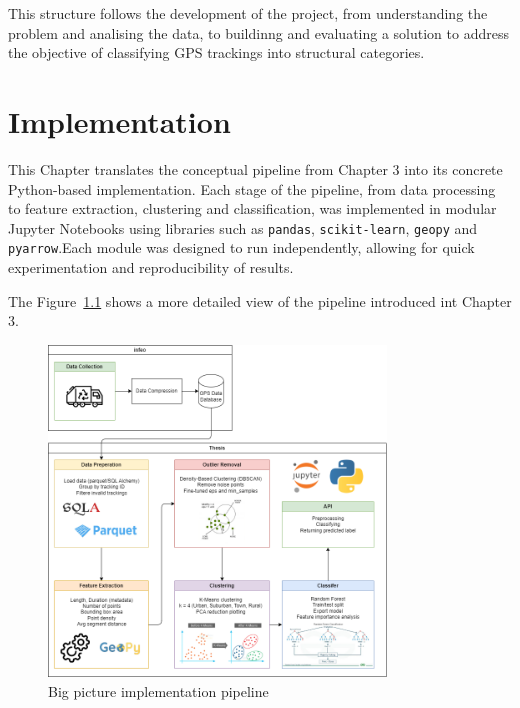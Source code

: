 \documentclass[a4paper,12pt,twoside]{scrreprt}
\begin{document}
This structure follows the development of the project, from understanding the
problem and analising the data, to buildinng and evaluating a solution to
address the objective of classifying GPS trackings into structural categories.
\chapter{Implementation}

This Chapter translates the conceptual pipeline from Chapter 3 into its
concrete Python-based implementation.
Each stage of the pipeline, from data processing to feature extraction,
clustering and classification, was implemented in modular Jupyter Notebooks
using libraries such as \texttt{pandas}, \texttt{scikit-learn}, \texttt{geopy}
and \texttt{pyarrow}.Each module was designed to run independently, allowing
for quick
experimentation and reproducibility of results.


The
Figure~\ref{fig:big_picture_implemetation_diagram} shows a more detailed view
of the pipeline introduced int Chapter 3.

\begin{figure}[htbp]
  \centering

  \includegraphics[width=0.8\textwidth]{Diagrams/drawio/big_picture_implementation.png}
  \caption{Big picture implementation pipeline}
  \label{fig:big_picture_implemetation_diagram}
\end{figure}
\FloatBarrier
\end{document}
